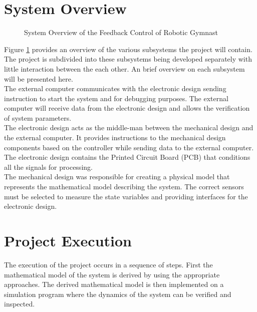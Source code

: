 \section{System Overview}
\begin{figure}[h]
	\centering
	
	\caption{System Overview of the Feedback Control of Robotic Gymnast}
	\label{fig:system_overview}
\end{figure}


Figure \ref{fig:system_overview} provides an overview of the various subsystems the project will contain. The project is subdivided into these subsystems being developed separately with little interaction between the each other. An brief overview on each subsystem will be presented here.\\

The external computer communicates with the electronic design sending instruction to start the system and for debugging purposes. The external computer will receive data from the electronic design and allows the verification of system parameters.\\

The electronic design acts as the middle-man between the mechanical design and the external computer. It provides instructions to the mechanical design components based on the controller while sending data to the external computer. The electronic design contains the Printed Circuit Board (PCB) that conditions all the signals for processing.\\

The mechanical design was responsible for creating a physical model that represents the mathematical model describing the system. The correct sensors must be selected to measure the state variables and providing interfaces for the electronic design.

\section{Project Execution}

The execution of the project occurs in a sequence of steps. First the mathematical model of the system is derived by using the appropriate approaches. The derived mathematical model is then implemented on a simulation program where the dynamics of the system can be verified and inspected.\\


